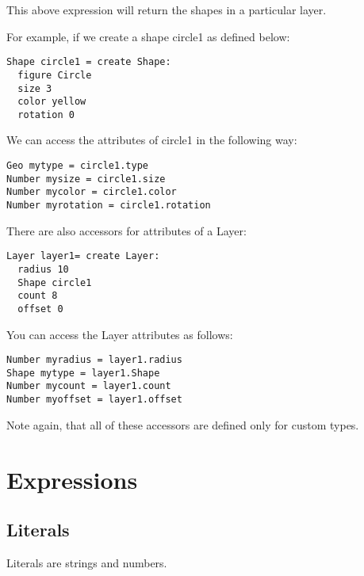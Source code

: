 \documentclass[12pt]{report}
\begin{document}
\noindent
This above expression will return the shapes in a particular layer.

\noindent
For example, if we create a shape circle1 as defined below:
\begin{verbatim}
Shape circle1 = create Shape:
  figure Circle
  size 3 
  color yellow 
  rotation 0
\end{verbatim}
We can access the attributes of circle1 in the following way:
\begin{verbatim}
Geo mytype = circle1.type 
Number mysize = circle1.size 
Number mycolor = circle1.color 
Number myrotation = circle1.rotation
\end{verbatim}

\noindent There are also accessors for attributes of a Layer:
\begin{verbatim}
Layer layer1= create Layer:
  radius 10
  Shape circle1
  count 8
  offset 0
\end{verbatim}

\noindent You can access the Layer attributes as follows:
\begin{verbatim}
Number myradius = layer1.radius
Shape mytype = layer1.Shape
Number mycount = layer1.count
Number myoffset = layer1.offset
\end{verbatim}

\noindent Note again, that all of these accessors are defined only for custom types. 


\newpage
{}
\section*{Expressions}

	\subsection*{Literals}
	Literals are strings and numbers.
\end{document}
